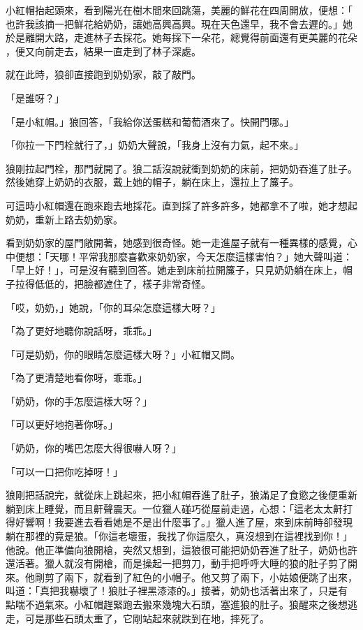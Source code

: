 \documentclass[oneside,10pt]{memoir} %
\begin{document}
小紅帽抬起頭來，看到陽光在樹木間來回跳蕩，美麗的鮮花在四周開放，便想：「
也許我該摘一把鮮花給奶奶，讓她高興高興。現在天色還早，我不會去遲的。」她
於是離開大路，走進林子去採花。她每採下一朵花，總覺得前面還有更美麗的花朵
，便又向前走去，結果一直走到了林子深處。

就在此時，狼卻直接跑到奶奶家，敲了敲門。

「是誰呀？」

「是小紅帽。」狼回答，「我給你送蛋糕和葡萄酒來了。快開門哪。」

「你拉一下門栓就行了，」奶奶大聲說，「我身上沒有力氣，起不來。」

狼剛拉起門栓，那門就開了。狼二話沒說就衝到奶奶的床前，把奶奶吞進了肚子。
然後她穿上奶奶的衣服，戴上她的帽子，躺在床上，還拉上了簾子。

可這時小紅帽還在跑來跑去地採花。直到採了許多許多，她都拿不了啦，她才想起
奶奶，重新上路去奶奶家。

看到奶奶家的屋門敞開著，她感到很奇怪。她一走進屋子就有一種異樣的感覺，心
中便想：「天哪！平常我那麼喜歡來奶奶家，今天怎麼這樣害怕？」她大聲叫道：
「早上好！」，可是沒有聽到回答。她走到床前拉開簾子，只見奶奶躺在床上，帽
子拉得低低的，把臉都遮住了，樣子非常奇怪。

「哎，奶奶，」她說，「你的耳朵怎麼這樣大呀？」

「為了更好地聽你說話呀，乖乖。」

「可是奶奶，你的眼睛怎麼這樣大呀？」小紅帽又問。

「為了更清楚地看你呀，乖乖。」

「奶奶，你的手怎麼這樣大呀？」

「可以更好地抱著你呀。」

「奶奶，你的嘴巴怎麼大得很嚇人呀？」

「可以一口把你吃掉呀！」

狼剛把話說完，就從床上跳起來，把小紅帽吞進了肚子，狼滿足了食慾之後便重新
躺到床上睡覺，而且鼾聲震天。一位獵人碰巧從屋前走過，心想：「這老太太鼾打
得好響啊！我要進去看看她是不是出什麼事了。」獵人進了屋，來到床前時卻發現
躺在那裡的竟是狼。「你這老壞蛋，我找了你這麼久，真沒想到在這裡找到你！」
他說。他正準備向狼開槍，突然又想到，這狼很可能把奶奶吞進了肚子，奶奶也許
還活著。獵人就沒有開槍，而是操起一把剪刀，動手把呼呼大睡的狼的肚子剪了開
來。他剛剪了兩下，就看到了紅色的小帽子。他又剪了兩下，小姑娘便跳了出來，
叫道：「真把我嚇壞了！狼肚子裡黑漆漆的。」接著，奶奶也活著出來了，只是有
點喘不過氣來。小紅帽趕緊跑去搬來幾塊大石頭，塞進狼的肚子。狼醒來之後想逃
走，可是那些石頭太重了，它剛站起來就跌到在地，摔死了。
\end{document}
